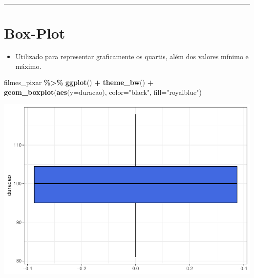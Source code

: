 \documentclass[
]{book}
\newenvironment{Shaded}{\begin{snugshade}}{\end{snugshade}}
\newcommand{\AttributeTok}[1]{\textcolor[rgb]{0.13,0.29,0.53}{#1}}
\newcommand{\FunctionTok}[1]{\textcolor[rgb]{0.13,0.29,0.53}{\textbf{#1}}}
\newcommand{\NormalTok}[1]{#1}
\newcommand{\SpecialCharTok}[1]{\textcolor[rgb]{0.81,0.36,0.00}{\textbf{#1}}}
\newcommand{\StringTok}[1]{\textcolor[rgb]{0.31,0.60,0.02}{#1}}
\providecommand{\tightlist}{%
  \setlength{\itemsep}{0pt}\setlength{\parskip}{0pt}}
\begin{document}
\begin{center}\rule{0.5\linewidth}{0.5pt}\end{center}

\section{Box-Plot}\label{box-plot}

\begin{itemize}
\tightlist
\item
  Utilizado para representar graficamente os quartis, além dos valores mínimo e máximo.
\end{itemize}

\begin{Shaded}
\begin{Highlighting}[]
\NormalTok{filmes\_pixar }\SpecialCharTok{\%\textgreater{}\%} \FunctionTok{ggplot}\NormalTok{() }\SpecialCharTok{+} \FunctionTok{theme\_bw}\NormalTok{() }\SpecialCharTok{+} 
  \FunctionTok{geom\_boxplot}\NormalTok{(}\FunctionTok{aes}\NormalTok{(}\AttributeTok{y=}\NormalTok{duracao), }\AttributeTok{color=}\StringTok{"black"}\NormalTok{, }\AttributeTok{fill=}\StringTok{"royalblue"}\NormalTok{) }
\end{Highlighting}
\end{Shaded}

\begin{center}\includegraphics{AED_files/figure-latex/boxplot_duracao-1} \end{center}
\end{document}
